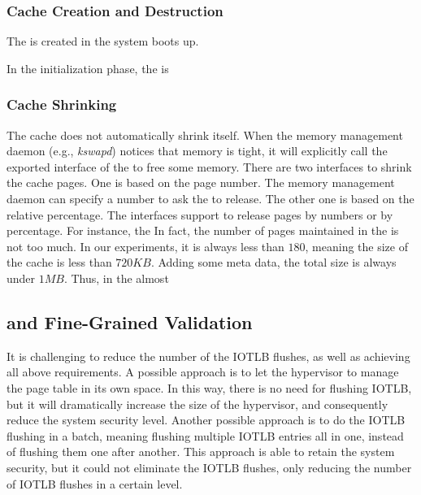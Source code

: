 \subsubsection{\name Cache Creation and Destruction}
The \cache is created in the system boots up.

In the initialization phase, the \cache is

\subsubsection{Cache Shrinking}
The \name cache does not automatically shrink itself.
When the memory management daemon (e.g., \emph{kswapd}) notices that memory is tight, it will explicitly call the exported interface of the \cache to free some memory.
There are two interfaces to shrink the cache pages. One is based on the page number. The memory management daemon can specify a number to ask the \cache to release.
The other one is based on the relative percentage.
The interfaces support to release pages by numbers or by percentage. 
For instance, the 
In fact, the number of pages maintained in the \cache is not too much. In our experiments, it is always less than $180$, meaning the size of the cache is less than $720KB$.
Adding some meta data, the total size is always under $1MB$. 
Thus, in the almost 

\subsection{\module and Fine-Grained Validation}

It is challenging to reduce the number of the IOTLB flushes, as well as achieving all above requirements.
A possible approach is to let the hypervisor to manage the page table in its own space.
In this way, there is no need for flushing IOTLB, but it will dramatically increase the size of the hypervisor, and consequently reduce the system security level.
Another possible approach is to do the IOTLB flushing in a batch, meaning flushing multiple IOTLB entries all in one, instead of flushing them one after another.
This approach is able to retain the system security, but it could not eliminate the IOTLB flushes, only reducing the number of IOTLB flushes in a certain level.

